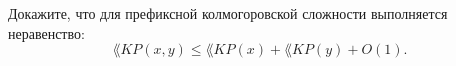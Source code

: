 Докажите, что для префиксной колмогоровской сложности выполняется неравенство:
$$\lang{KP}(x,y) \le \lang{KP}(x) + \lang{KP}(y) + O(1).$$